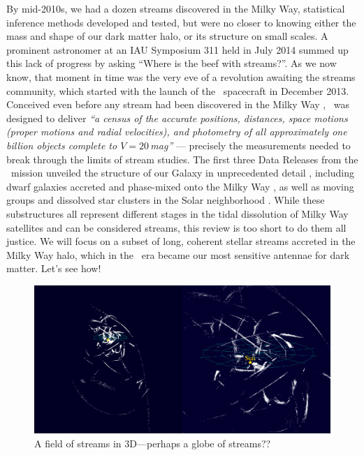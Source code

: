 \documentclass[final,5p,times,twocolumn,authoryear]{elsarticle}
\begin{document}
By mid-2010s, we had a dozen streams discovered in the Milky Way, statistical inference methods developed and tested, but were no closer to knowing either the mass and shape of our dark matter halo, or its structure on small scales.
A prominent astronomer at an IAU Symposium 311 held in July 2014 summed up this lack of progress by asking ``Where is the beef with streams?''.
As we now know, that moment in time was the very eve of a revolution awaiting the streams community, which started with the launch of the \gaia\ spacecraft in December 2013.
Conceived even before any stream had been discovered in the Milky Way \citep{lindegren:1993, battrick:1994, lindegren:1996}, \gaia\ was designed to deliver \emph{``a census of the accurate positions, distances, space motions (proper motions and radial velocities), and photometry of all approximately one billion objects complete to $V=20$\,mag''} \citep{perryman:2001} --- precisely the measurements needed to break through the limits of stream studies.
The first three Data Releases from the \gaia\ mission unveiled the structure of our Galaxy in unprecedented detail \citep{babusiaux:2018, helmi:2018, katz:2018, antoja:2021, smart:2021, drimmel:2023, schultheis:2023}, including dwarf galaxies accreted and phase-mixed onto the Milky Way \citep{belokurov:2018, helmi:2018b, myeong:2019, naidu:2020}, as well as moving groups and dissolved star clusters in the Solar neighborhood \citep{antoja:2018, kawata:2018, ramos:2018, meingast:2019, roser:2019}.
While these substructures all represent different stages in the tidal dissolution of Milky Way satellites and can be considered streams, this review is too short to do them all justice.
We will focus on a subset of long, coherent stellar streams accreted in the Milky Way halo, which in the \gaia\ era became our most sensitive antennae for dark matter.
Let's see how!

\begin{figure}[t!]
\begin{center}
\includegraphics[width=1\textwidth]{figures/fos_3d.png}
\end{center}
\caption{%
A field of streams in 3D---perhaps a globe of streams??
\label{fig:fos_3d}
}
\end{figure}
\end{document}
